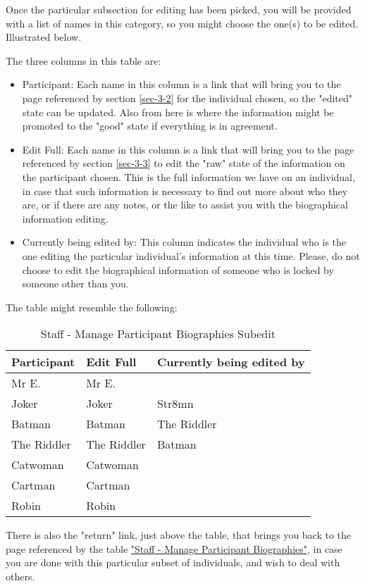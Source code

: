 \documentclass[captions=tablesignature]{scrartcl}
\begin{document}
Once the particular subsection for editing has been picked, you
will be provided with a list of names in this category, so you
might choose the one(s) to be edited.  Illustrated below.

The three columns in this table are:
\begin{itemize}
\item Participant: Each name in this column is a link that will bring
you to the page referenced by section \ref{sec-3-2} for the
individual chosen, so the "edited" state can be updated.  Also
from here is where the information might be promoted to the
"good" state if everything is in agreement.
\item Edit Full: Each name in this column is a link that will bring you
to the page referenced by section \ref{sec-3-3}
to edit the "raw" state of the information on the participant
chosen. This is the full information we have on an individual, in
case that such information is necessary to find out more about
who they are, or if there are any notes, or the like to assist
you with the biographical information editing.
\item Currently being edited by: This column indicates the individual
who is the one editing the particular individual's information at
this time.  Please, do not choose to edit the biographical
information of someone who is locked by someone other than you.
\end{itemize}

The table might resemble the following:
\begin{table}[htb]
\caption{\label{tbl:staffmanageparticipantbiographiessubedit}Staff - Manage Participant Biographies Subedit}
\centering
\begin{tabular}{lll}
\hline
Participant & Edit Full & Currently being edited by\\
\hline
Mr E. & Mr E. & \\
Joker & Joker & Str8mn\\
Batman & Batman & The Riddler\\
The Riddler & The Riddler & Batman\\
Catwoman & Catwoman & \\
Cartman & Cartman & \\
Robin & Robin & \\
\hline
\end{tabular}
\end{table}

There is also the "return" link, just above the table, that brings
you back to the page referenced by the table \hyperref[tbl:staffmanageparticipantbiographies]{"Staff - Manage
Participant Biographies"}, in case you are done with this particular
subset of individuals, and wish to deal with others.
\end{document}

